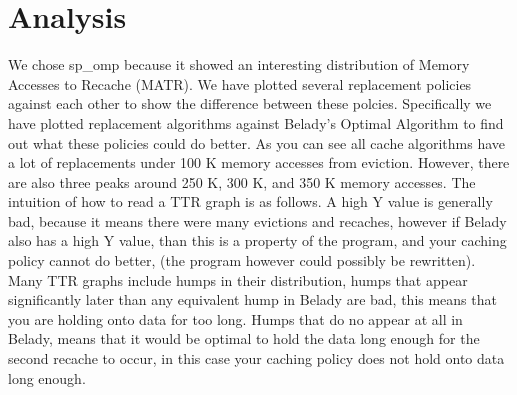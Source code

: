 \section{Analysis}


We chose sp\_omp because it showed an interesting distribution of Memory Accesses to Recache (MATR).
We have plotted several replacement policies against each other to show the difference between these polcies.
Specifically we have plotted replacement algorithms against Belady's Optimal Algorithm to find out what these policies could do better.
As you can see all cache algorithms have a lot of replacements under 100 K memory accesses from eviction.
However, there are also three peaks around 250 K, 300 K, and 350 K memory accesses.
The intuition of how to read a TTR graph is as follows.
A high Y value is generally bad, because it means there were many evictions and recaches,
 however if Belady also has a high Y value, than this is a property of the program, and your caching policy cannot do better,
 (the program however could possibly be rewritten).
Many TTR graphs include humps in their distribution, humps that appear significantly later than any equivalent hump in Belady are bad,
 this means that you are holding onto data for too long.
Humps that do no appear at all in Belady, means that it would be optimal to hold the data long enough for the second recache to occur,
 in this case your caching policy does not hold onto data long enough.

